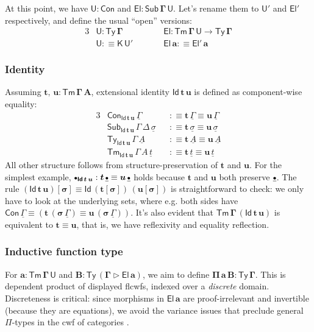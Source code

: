\documentclass[12pt,a4paper,twoside,openany]{book}
\theoremstyle{remark}
\theoremstyle{definition}
\theoremstyle{theorem}
\newcommand{\bs}[1]{\boldsymbol{#1}}
\newcommand{\Con}{\mathsf{Con}}
\newcommand{\Sub}{\mathsf{Sub}}
\newcommand{\Tm}{\mathsf{Tm}}
\newcommand{\Ty}{\mathsf{Ty}}
\newcommand{\U}{\mathsf{U}}
\newcommand{\El}{\mathsf{El}}
\newcommand{\Id}{\mathsf{Id}}
\newcommand{\ext}{\triangleright}
\newcommand{\emptycon}{\scaleobj{.75}\bullet}
\newcommand{\K}{\mathsf{K}}
\newcommand{\bsigma}{\bs{\sigma}}
\newcommand{\bt}{\bs{t}}
\newcommand{\bu}{\bs{u}}
\newcommand{\ba}{\bs{a}}
\newcommand{\bU}{\bs{\U}}
\newcommand{\bEl}{\bs{\El}}
\newcommand{\ul}[1]{\underline{#1}}
\newcommand{\ulGamma}{\ul{\Gamma}}
\newcommand{\ulsigma}{\ul{\sigma}}
\newcommand{\ulemptycon}{\ul{\emptycon}}
\newcommand{\ult}{\ul{t}}
\newcommand{\ulA}{\ul{A}}
\newcommand{\defn}{:\equiv}
\begin{document}
At this point, we have $\bs{\U : \Con}$ and $\bs{\El : \Sub\,\Gamma\,\U}$. Let's
rename them to $\bU'$ and $\bEl'$ respectively, and define the usual ``open''
versions:
\begin{alignat*}{3}
  &\bs{\U} : \bs{\Ty\,\Gamma} &&\bs{\El} : \bs{\Tm\,\Gamma\,\U} \to \bs{\Ty\,\Gamma}\\
  &\bs{\U} \defn \bs{\K\,\U'}\hspace{2em}&&\bs{\El}\,\ba \defn \bEl'\,\ba
\end{alignat*}

\subsubsection{Identity}

Assuming $\bs{t,\,u : \Tm\,\Gamma\,A}$, extensional identity $\bs{\Id\,t\,u}$ is
defined as component-wise equality:
\begin{alignat*}{3}
  & \Con_{\bs{\Id\,t\,u}}\,\ulGamma &&\defn \bt\,\ulGamma \equiv \bu\,\ulGamma\\
  & \Sub_{\bs{\Id\,t\,u}}\,\Gamma\,\Delta\,\ulsigma &&\defn \bt\,\ulsigma \equiv \bu\,\ulsigma\\
  & \Ty_{\bs{\Id\,t\,u}}\,\Gamma\,\ulA &&\defn \bt\,\ulA \equiv \bu\,\ulA\\
  & \Tm_{\bs{\Id\,t\,u}}\,\Gamma\,A\,\ult &&\defn \bt\,\ult \equiv \bu\,\ult
\end{alignat*}
All other structure follows from structure-preservation of $\bt$ and $\bu$. For
the simplest example, $\emptycon_{\bs{\Id\,t\,u}} : \bt\,\ulemptycon \equiv
\bu\,\ulemptycon$ holds because $\bt$ and $\bu$ both preserve $\ulemptycon$. The
rule $\bs{(\Id\,t\,u)[\sigma]} \equiv \bs{\Id\,(t[\sigma])\,(u[\sigma])}$ is
straightforward to check: we only have to look at the underlying sets, where
e.g. both sides have $\Con\,\ulGamma \equiv (\bt\,(\bsigma\,\ulGamma) \equiv
\bu\,(\bsigma\,\ulGamma))$. It's also evident that
$\bs{\Tm\,\Gamma\,(\Id\,t\,u)}$ is equivalent to $\bt \equiv \bu$, that is, we
have reflexivity and equality reflection.

\subsubsection{Inductive function type}

For $\bs{a : \Tm\,\Gamma\,\U}$ and $\bs{B : \Ty\,(\Gamma \ext \El\,a)}$, we aim
to define $\bs{\Pi\,a\,B : \Ty\,\Gamma}$. This is dependent product of displayed
flcwfs, indexed over a \emph{discrete} domain. Discreteness is critical: since
morphisms in $\bs{\El\,a}$ are proof-irrelevant and invertible (because they are
equations), we avoid the variance issues that preclude general $\Pi$-types in
the cwf of categories \cite[Secion~A1.5]{johnstone2002sketches}.
\end{document}
